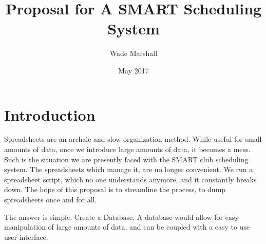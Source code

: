\documentclass{article}
\title{Proposal for A SMART Scheduling System}
\author{Wade Marshall }
\date{May 2017}
\begin{document}
\maketitle

\section{Introduction}
Spreadsheets are an archaic and slow organization method. While useful for small amounts of data, once we introduce large amounts of data, it
becomes a mess. Such is the situation we are presently faced with the SMART club scheduling system. The spreadsheets which manage it, are no
longer convenient. We run a spreadsheet script, which no one understands anymore, and it constantly breaks down. The hope of this proposal is to 
streamline the process, to dump spreadsheets once and for all. 

The answer is simple. Create a Database. A database would allow for easy manipulation of large amounts of data, and can be coupled with a easy
to use user-interface. 
\end{document}
